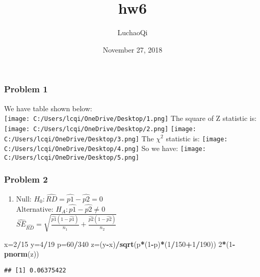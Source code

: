 \documentclass[]{article}
\title{hw6}
\author{LuchaoQi}
\date{November 27, 2018}
\newenvironment{Shaded}{\begin{snugshade}}{\end{snugshade}}
\newcommand{\KeywordTok}[1]{\textcolor[rgb]{0.13,0.29,0.53}{\textbf{#1}}}
\newcommand{\DecValTok}[1]{\textcolor[rgb]{0.00,0.00,0.81}{#1}}
\newcommand{\OperatorTok}[1]{\textcolor[rgb]{0.81,0.36,0.00}{\textbf{#1}}}
\newcommand{\NormalTok}[1]{#1}
\providecommand{\tightlist}{%
  \setlength{\itemsep}{0pt}\setlength{\parskip}{0pt}}
\begin{document}
\maketitle

\subsubsection{Problem 1}\label{problem-1}

We have table shown below:\\
\texttt{[image: C:/Users/lcqi/OneDrive/Desktop/1.png]} The square of Z
statistic is: \texttt{[image: C:/Users/lcqi/OneDrive/Desktop/2.png]}
\texttt{[image: C:/Users/lcqi/OneDrive/Desktop/3.png]} The \(\chi^2\)
statistic is: \texttt{[image: C:/Users/lcqi/OneDrive/Desktop/4.png]} So
we have: \texttt{[image: C:/Users/lcqi/OneDrive/Desktop/5.png]}

\subsubsection{Problem 2}\label{problem-2}

\begin{enumerate}
\def\labelenumi{\alph{enumi}.}
\tightlist
\item
  Null: \(H_0 : \hat{RD} = \hat{p1} - \hat{p2} = 0\)\\
  Alternative: \(H_A : \hat{p1} - \hat{p2} \neq0\)\\
  \({\hat{SE}}_{\hat{RD}}=\sqrt{\frac{\hat{p1}(1-\hat{p1})}{n_1}+\frac{\hat{p2}(1-\hat{p2})}{n_2}}\)
\end{enumerate}

\begin{Shaded}
\begin{Highlighting}[]
\NormalTok{x=}\DecValTok{2}\OperatorTok{/}\DecValTok{15}
\NormalTok{y=}\DecValTok{4}\OperatorTok{/}\DecValTok{19}
\NormalTok{p=}\DecValTok{60}\OperatorTok{/}\DecValTok{340}
\NormalTok{z=(y}\OperatorTok{-}\NormalTok{x)}\OperatorTok{/}\KeywordTok{sqrt}\NormalTok{(p}\OperatorTok{*}\NormalTok{(}\DecValTok{1}\OperatorTok{-}\NormalTok{p)}\OperatorTok{*}\NormalTok{(}\DecValTok{1}\OperatorTok{/}\DecValTok{150}\OperatorTok{+}\DecValTok{1}\OperatorTok{/}\DecValTok{190}\NormalTok{))}
\DecValTok{2}\OperatorTok{*}\NormalTok{(}\DecValTok{1}\OperatorTok{-}\KeywordTok{pnorm}\NormalTok{(z))}
\end{Highlighting}
\end{Shaded}

\begin{verbatim}
## [1] 0.06375422
\end{verbatim}
\end{document}

